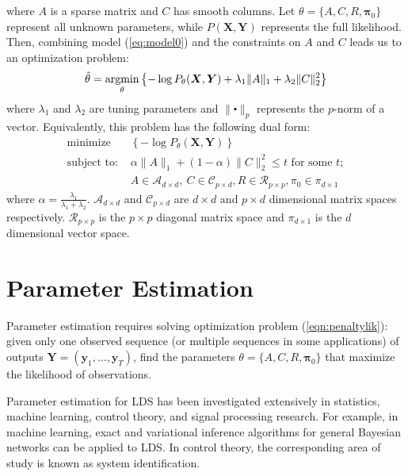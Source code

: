 \documentclass[fleqn,12pt]{article}
\let\oldref\ref
\renewcommand{\ref}[1]{(\oldref{#1})}
\newcommand{\argmin}{\operatornamewithlimits{argmin}}
\providecommand{\mb}[1]{\boldsymbol{#1}}
\newcommand{\by}{\mb{y}}
\newcommand{\bX}{\mb{X}}
\newcommand{\bY}{\mb{Y}}
\begin{document}
where $A$ is a sparse matrix and $C$ has smooth columns.
Let $\theta =\{A,C,R,\mathbf{\pi}_0\}$ represent all unknown parameters, while $P(\bX,\bY)$ represents the full likelihood. Then, combining model \ref{eq:model0} and the constraints on $A$ and $C$ leads us to an optimization problem:
%
%
%
\begin{equation}\label{eqn:penaltylik}
\hat{\theta}=\argmin_{\substack{\theta}}\left\{-\log P_\theta(\bX,\bY)+\lambda_1\|A\|_1+\lambda_2\|C\|_2^2\right\}
\end{equation}
where $\lambda_1$ and $\lambda_2$ are tuning parameters and $\|\centerdot\|_p$ represents the $p$-norm of a vector. Equivalently, this problem has the following dual form:
\begin{equation*}\label{eqn:penaltylikdual}
\begin{aligned}
&\text{minimize}&\left\{-\log P_\theta(\bX,\bY)\right\}&\\
&\text{subject to: }
& \alpha\|A\|_1+ (1-\alpha)\|C\|_2^2 \leq t \text{ for some }t; &\\
&& A\in \mathcal{A}_{d\times d},\ C \in \mathcal{C}_{p \times d}, R \in \mathcal{R}_{p\times p}, \pi_0 \in \mathcal{\pi}_{d\times 1}&
\end{aligned}
\end{equation*}
where $\alpha = \frac{\lambda_1}{\lambda_1 + \lambda_2}$. $\mathcal{A}_{d\times d}$ and $\mathcal{C}_{p \times d}$ are $d\times d$ and $p \times d$ dimensional matrix spaces respectively. $\mathcal{R}_{p \times p}$ is the $p \times p$ diagonal matrix space and $\mathcal{\pi}_{d\times 1}$ is the $d$ dimensional vector space.
\section{Parameter Estimation}
Parameter estimation requires solving optimization problem \ref{eqn:penaltylik}: given only one observed sequence (or multiple sequences in some applications) of outputs $\bY=(\by_1,\ldots,\by_T)$, find the parameters $\theta=\{A,C,R,\mathbf{\pi}_0\}$ that maximize the likelihood of observations.

Parameter estimation for LDS has been investigated extensively in statistics, machine learning, control theory, and signal processing research. For example, in machine learning, exact and variational inference algorithms for general Bayesian networks can be applied to LDS. In control theory, the corresponding area of study is known as system identification.
\end{document}
